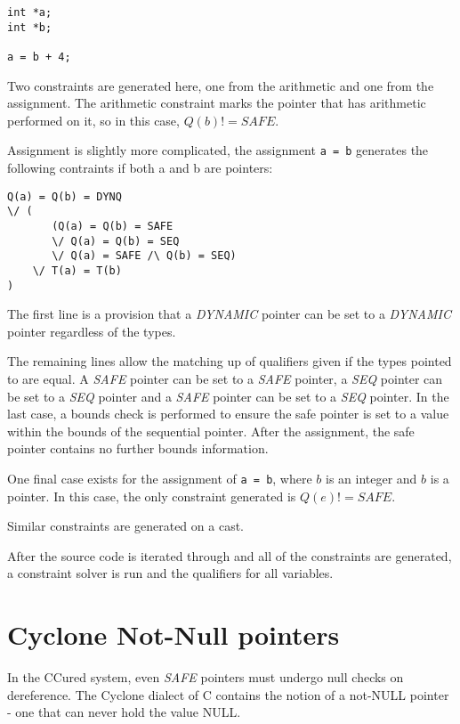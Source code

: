 \begin{verbatim}
int *a;
int *b;

a = b + 4;
\end{verbatim}

Two constraints are generated here, one from the arithmetic and one from the assignment.
The arithmetic constraint marks the pointer that has arithmetic performed on it, so in this case, $Q(b) != SAFE$.

Assignment is slightly more complicated, the assignment \verb|a = b| generates the following contraints if both a and b are pointers:

\begin{verbatim}
Q(a) = Q(b) = DYNQ 
\/ (
       (Q(a) = Q(b) = SAFE 
       \/ Q(a) = Q(b) = SEQ
       \/ Q(a) = SAFE /\ Q(b) = SEQ) 
    \/ T(a) = T(b)
)
\end{verbatim}

The first line is a provision that a \textit{DYNAMIC} pointer can be set to a \textit{DYNAMIC} pointer regardless of the types.

The remaining lines allow the matching up of qualifiers given if the types pointed to are equal.
A \textit{SAFE} pointer can be set to a \textit{SAFE} pointer, a \textit{SEQ} pointer can be set to a \textit{SEQ} pointer and a \textit{SAFE} pointer can be set to a \textit{SEQ} pointer.
In the last case, a bounds check is performed to ensure the safe pointer is set to a value within the bounds of the sequential pointer.
After the assignment, the safe pointer contains no further bounds information.

One final case exists for the assignment of \verb|a = b|, where $b$ is an integer and $b$ is a pointer.
In this case, the only constraint generated is $Q(e) != SAFE$.

Similar constraints are generated on a cast.

After the source code is iterated through and all of the constraints are generated, a constraint solver is run and the qualifiers for all variables.

\section{Cyclone Not-Null pointers}

In the CCured system, even \textit{SAFE} pointers must undergo null checks on dereference.
The Cyclone dialect of C contains the notion of a not-NULL pointer - one that can never hold the value NULL.
